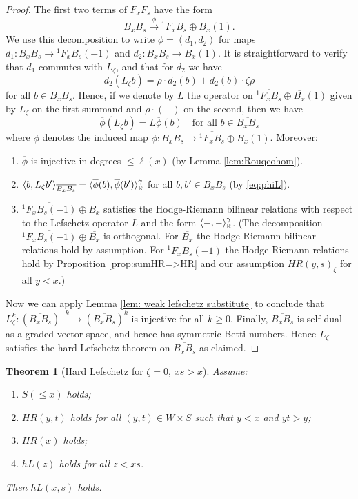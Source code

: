 \documentclass[11pt]{amsart}
\numberwithin{equation}{section}
\def\g{\gamma}
\def\z{\zeta}
\def\ov{\overline}
\def\to{\rightarrow}
\def\longto{\longrightarrow}
\newtheorem{thm}{Theorem}[section]
\theoremstyle{definition}
\theoremstyle{remark}
\begin{document}
{\begin{proof}
The first two terms of $F_xF_s$ have the form
\[
B_xB_s \stackrel{\phi}{\longto} {}^1 F_xB_s \oplus B_x(1).
\]
We use this decomposition
to write $\phi = (d_1, d_2)$ for maps $d_1 : B_xB_s \to {}^1F_xB_s(-1)$
and $d_2 : B_xB_s \to B_x(1)$. It is straightforward to verify that 
$d_1$ commutes with $L_\z$, and that for $d_2$ we have
\[
d_2(L_{\z} b) = \rho \cdot d_2(b) + d_2(b) \cdot \z \rho
\]
 for all $b \in B_xB_s$. Hence, if we denote by $L$ the operator on
 $\overline{{}^1 F_xB_s} \oplus \overline{B_x}(1)$ given by $L_\z$ on the first summand and
 $\rho \cdot (- )$ on the second, then we have
 \begin{equation}
   \label{eq:dphicommute}
   \overline{\phi}(L_\z b) = L \overline{\phi}(b) \quad \text{for all $b \in
\overline{B_xB_s}$}
 \end{equation}
where $\overline{\phi}$ denotes the induced map
$\ov{\phi}: \overline{B_xB_s} \to \overline{{}^1 F_xB_s}
\oplus \overline{B_x}(1)$. Moreover:
  \begin{enumerate}
  \item $\overline{\phi}$ is injective in degrees $\le \ell(x)$ (by
    Lemma \ref{lem:Rouqcohom}).
  \item $\langle b, L_\z b' \rangle_{\overline{B_xB_s}} = \langle
    \overline{\phi}(b), \overline{\phi}(b') \rangle^\g_{\RM}$ for all
    $b, b' \in \overline{B_xB_s}$ (by \eqref{eq:phiL}).
\item $\overline{{}^1 F_xB_s(-1)}
\oplus \overline{B_x}$ satisfies the Hodge-Riemann bilinear relations
with respect to the Lefschetz operator $L$ and the form
$\langle -, - \rangle^\g_\RM$. (The decomposition $\overline{{}^1 F_xB_s(-1)}
\oplus \overline{B_x}$ is orthogonal. For $\overline{B_x}$ the
Hodge-Riemann bilinear relations hold by assumption. For $\overline{{}^1
  F_xB_s(-1)}$ the Hodge-Riemann relations hold by Proposition
\ref{prop:sumHR=>HR} and our assumption $HR(y,s)_\z$ for all $y < x$.)
  \end{enumerate}
Now we can apply   Lemma \ref{lem:
  weak lefschetz substitute} to conclude that $L_\z^k :
(\overline{B_xB_s})^{-k} \to (\overline{B_xB_s})^{k}$ is injective for
all $k \ge 0$. Finally, $\overline{B_xB_s}$ is self-dual as a graded
vector space, and hence has symmetric Betti numbers. Hence $L_\z$
satisfies the hard Lefschetz theorem on $\overline{B_xB_s}$ as
claimed.
\end{proof}


\begin{thm}[Hard Lefschetz for $\z = 0$, $xs > x$]
 \label{thm:hL}
Assume:
\begin{enumerate}
\item $S(\le \! x)$ holds;
\item $HR(y,t)$ holds for
  all $(y,t) \in W \times S$ such that $y < x$ and $yt >
  y$;
\item $HR(x)$ holds;
\item $hL(z)$ holds for all $z < xs$.
\end{enumerate}
 Then $hL(x,s)$ holds.
\end{thm}

}
\end{document}
